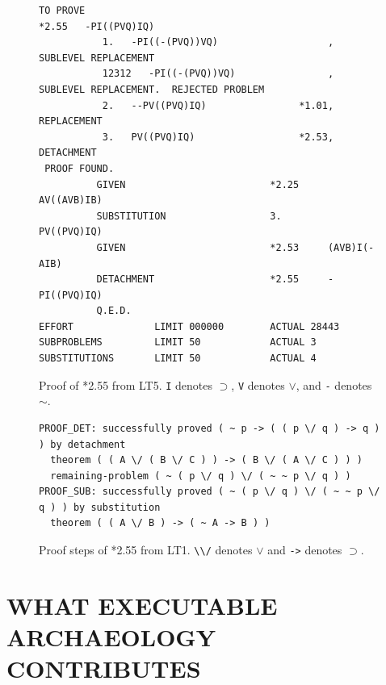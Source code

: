 \documentclass{IEEEcsmag}
\begin{document}
\begin{figure}
\begin{lstlisting}
TO PROVE
*2.55   -PI((PVQ)IQ)
           1.   -PI((-(PVQ))VQ)                   , SUBLEVEL REPLACEMENT
           12312   -PI((-(PVQ))VQ)                , SUBLEVEL REPLACEMENT.  REJECTED PROBLEM
           2.   --PV((PVQ)IQ)                *1.01, REPLACEMENT
           3.   PV((PVQ)IQ)                  *2.53, DETACHMENT
 PROOF FOUND.
          GIVEN                         *2.25     AV((AVB)IB)
          SUBSTITUTION                  3.        PV((PVQ)IQ)
          GIVEN                         *2.53     (AVB)I(-AIB)
          DETACHMENT                    *2.55     -PI((PVQ)IQ)
          Q.E.D.
EFFORT              LIMIT 000000        ACTUAL 28443
SUBPROBLEMS         LIMIT 50            ACTUAL 3
SUBSTITUTIONS       LIMIT 50            ACTUAL 4
\end{lstlisting}
\caption{Proof of *2.55 from LT5. \lstinline|I| denotes $\supset$, \lstinline|V| denotes
$\vee$, and \lstinline|-| denotes $\sim$.}
\label{proof5255}
\end{figure}

\begin{figure}
\begin{lstlisting}
PROOF_DET: successfully proved ( ~ p -> ( ( p \/ q ) -> q ) ) by detachment 
  theorem ( ( A \/ ( B \/ C ) ) -> ( B \/ ( A \/ C ) ) ) 
  remaining-problem ( ~ ( p \/ q ) \/ ( ~ ~ p \/ q ) )
PROOF_SUB: successfully proved ( ~ ( p \/ q ) \/ ( ~ ~ p \/ q ) ) by substitution 
  theorem ( ( A \/ B ) -> ( ~ A -> B ) )
\end{lstlisting}
\caption{Proof steps of *2.55 from LT1. \lstinline|\\/| denotes $\vee$ and \lstinline|->| denotes $\supset$.}
\label{proof1255}
\end{figure}



%
%

\section{WHAT EXECUTABLE ARCHAEOLOGY CONTRIBUTES}
\label{sec:contribution}

\end{document}
